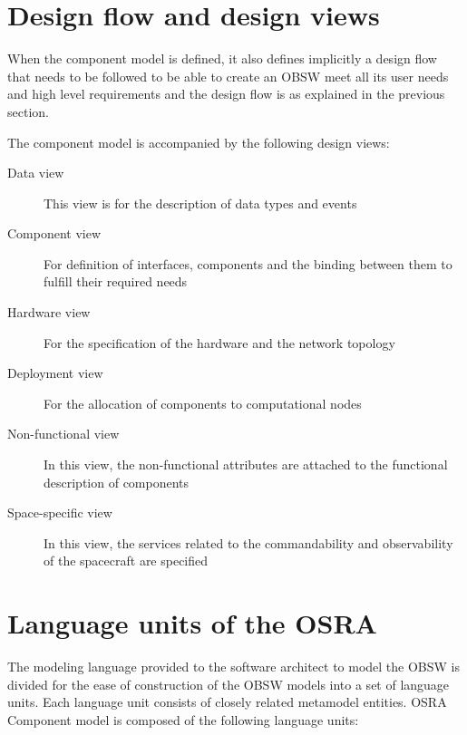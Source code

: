 \section{Design flow and design views}
\label{section: Design flow and views}
When the component model is defined, it also defines implicitly a design flow that needs to be followed to be able to create an OBSW meet all its user needs and high level requirements and the design flow is as explained in the previous section. 

The component model is accompanied by the following design views:
\begin{description}
\item [Data view] This view is for the description of data types and events
\item [Component view] For definition of interfaces, components and the binding between them to fulfill their required needs
\item [Hardware view] For the specification of the hardware and the network topology
\item [Deployment view] For the allocation of components to computational nodes
\item [Non-functional view] In this view, the non-functional attributes are attached to the functional description of components
\item [Space-specific view] In this view, the services related to the commandability and observability of the spacecraft are specified
\end{description}  

\section{Language units of the OSRA}
The modeling language provided to the software architect to model the OBSW is divided for the ease of construction of the OBSW models into a set of language units. Each language unit consists of closely related metamodel entities. OSRA Component model is composed of the following language units:

